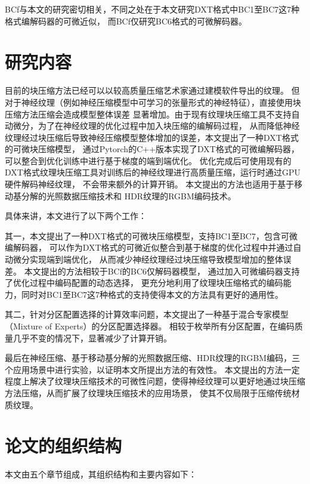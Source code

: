 BCf\cite{weinreich2024real}与本文的研究密切相关，不同之处在于本文研究DXT格式中BC1至BC7这7种格式编解码器的可微近似，
而BCf\cite{weinreich2024real}仅研究BC6格式的可微解码器。

\section{研究内容}

目前的块压缩方法已经可以以较高质量压缩艺术家通过建模软件导出的纹理。
但对于神经纹理（例如神经压缩模型中可学习的张量形式的神经特征），直接使用块压缩方法压缩会造成模型整体误差
显著增加。由于现有纹理块压缩工具不支持自动微分，为了在神经纹理的优化过程中加入块压缩的编解码过程，
从而降低神经纹理经过块压缩后导致神经压缩模型整体增加的误差，本文提出了一种DXT格式的可微块压缩模型，
通过Pytorch的C++版本实现了DXT格式的可微编解码器，可以整合到优化训练中进行基于梯度的端到端优化。
优化完成后可使用现有的DXT格式纹理块压缩工具对训练后的神经纹理进行高质量压缩，运行时通过GPU硬件解码神经纹理，
不会带来额外的计算开销。
本文提出的方法也适用于基于移动基分解的光照数据压缩技术\cite{silvennoinen2021moving}和
HDR纹理的RGBM编码技术。

具体来讲，本文进行了以下两个工作：

其一，本文提出了一种DXT格式的可微块压缩模型，支持BC1至BC7，包含可微编解码器，
可以作为DXT格式的可微近似整合到基于梯度的优化过程中并通过自动微分实现端到端优化，
从而减少神经纹理经过块压缩导致模型增加的整体误差。
本文提出的方法相较于BCf\cite{weinreich2024real}的BC6仅解码器模型，
通过加入可微编码器支持了优化过程中编码配置的动态选择，
更充分地利用了纹理块压缩格式的编码能力，同时对BC1至BC7这7种格式的支持使得本文的方法具有更好的通用性。

其二，针对分区配置选择的计算效率问题，本文提出了一种基于混合专家模型（Mixture of Experts）的分区配置选择器。
相较于枚举所有分区配置，在编码质量几乎不变的情况下，显著减少了计算开销。

最后在神经压缩\cite{weinreich2024real}、基于移动基分解的光照数据压缩\cite{silvennoinen2021moving}、HDR纹理的RGBM编码，三个应用场景中进行实验，以证明本文所提出方法的有效性。
本文提出的方法一定程度上解决了纹理块压缩技术的可微性问题，使得神经纹理可以更好地通过块压缩方法压缩，从而扩展了纹理块压缩技术的应用场景，
使其不仅局限于压缩传统材质纹理。

\section{论文的组织结构}

本文由五个章节组成，其组织结构和主要内容如下：

